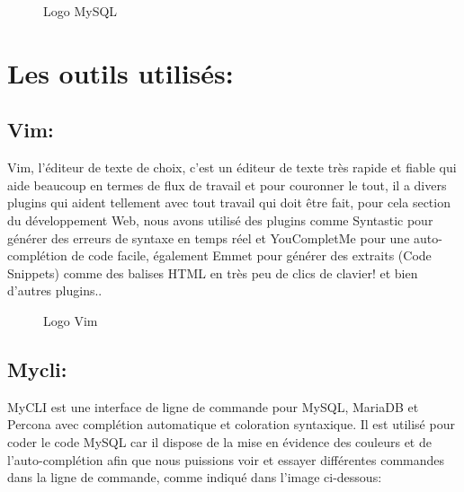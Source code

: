 \documentclass[12pt]{report}
\begin{document}
\vspace{0.7in}

\begin{figure}[h]
\centering
\vspace{0.1in}
\caption{Logo MySQL}
\end{figure}

\newpage

\section{Les outils utilisés:}

\subsection{Vim:}

Vim, l'éditeur de texte de choix, c'est un éditeur de texte très rapide et fiable qui aide beaucoup en termes de flux de travail et pour couronner le tout, il a divers plugins qui aident tellement avec tout travail qui doit être fait, pour cela section du développement Web, nous avons utilisé des plugins comme Syntastic pour générer des erreurs de syntaxe en temps réel et YouCompletMe pour une auto-complétion de code facile, également Emmet pour générer des extraits (Code Snippets) comme des balises HTML en très peu de clics de clavier! et bien d'autres plugins..

\vspace{0.1in}

\begin{figure}[h]
\centering
\vspace{0.0in}
\caption{Logo Vim}
\end{figure}

\vspace{-0.15in}

\subsection{Mycli:}

MyCLI est une interface de ligne de commande pour MySQL, MariaDB et Percona avec complétion automatique et coloration syntaxique. Il est utilisé pour coder le code MySQL car il dispose de la mise en évidence des couleurs et de l'auto-complétion afin que nous puissions voir et essayer différentes commandes dans la ligne de commande, comme indiqué dans l'image ci-dessous:
\end{document}
